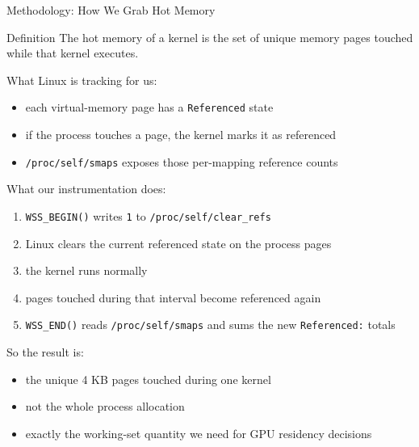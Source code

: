 \documentclass[aspectratio=169]{beamer}
\begin{document}
\begin{frame}{Methodology: How We Grab Hot Memory}
  \begin{block}{Definition}
    The hot memory of a kernel is the set of unique memory pages touched
    while that kernel executes.
  \end{block}

  \vspace{0.5em}
  What Linux is tracking for us:
  \begin{itemize}
    \item each virtual-memory page has a \texttt{Referenced} state
    \item if the process touches a page, the kernel marks it as referenced
    \item \texttt{/proc/self/smaps} exposes those per-mapping reference counts
  \end{itemize}

  \vspace{0.5em}
  What our instrumentation does:
  \begin{enumerate}
    \item \texttt{WSS\_BEGIN()} writes \texttt{1} to \texttt{/proc/self/clear\_refs}
    \item Linux clears the current referenced state on the process pages
    \item the kernel runs normally
    \item pages touched during that interval become referenced again
    \item \texttt{WSS\_END()} reads \texttt{/proc/self/smaps} and sums the
          new \texttt{Referenced:} totals
  \end{enumerate}

  \vspace{0.5em}
  So the result is:
  \begin{itemize}
    \item the unique 4 KB pages touched during one kernel
    \item not the whole process allocation
    \item exactly the working-set quantity we need for GPU residency decisions
  \end{itemize}
\end{frame}
\end{document}
